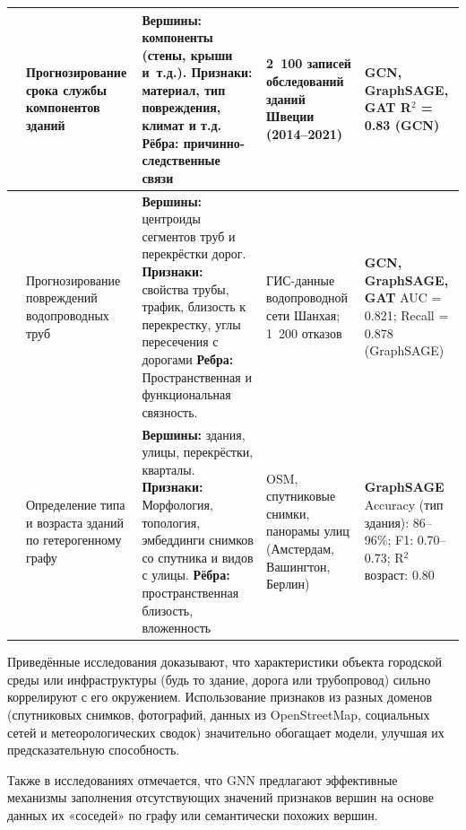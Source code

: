 \documentclass[14pt]{extarticle}
\begin{document}
{\begin{longtable}{|p{1.8cm} | p{3.5cm} | p{4.5cm} | p{2.5cm} | p{2.8cm}|}
    \cite{wu2025lifespan} &
    Прогнозирование срока службы компонентов зданий &
    \textbf{Вершины:} компоненты (стены, крыши и~т.д.). \newline
    \textbf{Признаки:} материал, тип повреждения, климат и т.д. \newline    
    \textbf{Рёбра:} причинно-следственные связи &
    2~100 записей обследований зданий Швеции (2014--2021) &
    \textbf{GCN, GraphSAGE, GAT} \newline R$^2$ = 0.83 (GCN) \\
    \hline

    \cite{hu2025pipes} &
    Прогнозирование повреждений водопроводных труб &
    \textbf{Вершины:} центроиды сегментов труб и перекрёстки дорог.
    \textbf{Признаки:} свойства трубы, трафик, близость к перекрестку, углы пересечения с дорогами \newline \textbf{Ребра:} Пространственная и функциональная связность.&
    ГИС-данные водопроводной сети Шанхая; 1~200 отказов &
    \textbf{GCN, GraphSAGE, GAT} \newline AUC = 0.821; Recall = 0.878 (GraphSAGE) \\
    \hline

    \cite{liang2026hetero} &
    Определение типа и возраста зданий по гетерогенному графу &
    \textbf{Вершины:} здания, улицы, перекрёстки, кварталы. \newline
    \textbf{Признаки:} Морфология, топология, эмбеддинги снимков со спутника и видов с улицы. \newline    
    \textbf{Рёбра:} пространственная близость, вложенность &
    OSM, спутниковые снимки, панорамы улиц (Амстердам, Вашингтон, Берлин) &
     \textbf{GraphSAGE} \newline Accuracy (тип здания): 86--96\%; F1: 0.70--0.73; R$^2$ возраст: 0.80 \\

\end{longtable}
}

Приведённые исследования доказывают, что характеристики объекта городской
среды или инфраструктуры (будь то здание, дорога или трубопровод) сильно
коррелируют с его окружением. Использование признаков из разных доменов
(спутниковых снимков, фотографий, данных из OpenStreetMap, социальных сетей
и метеорологических сводок) значительно обогащает модели, улучшая их
предсказательную способность.

Также в исследованиях отмечается, что GNN предлагают эффективные механизмы
заполнения отсутствующих значений признаков вершин на основе данных
их «соседей» по графу или семантически похожих вершин.
\end{document}
